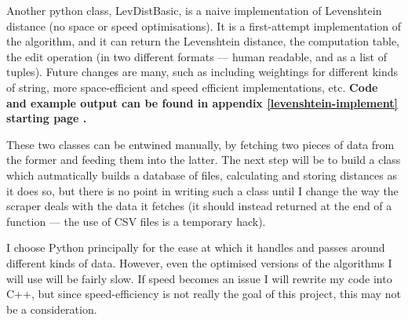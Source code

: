 Another python class, LevDistBasic, is a naive implementation of
Levenshtein distance (no space or speed optimisations). It is a
first-attempt implementation of the algorithm, and it can return the
Levenshtein distance, the computation table, the edit operation (in
two different formats --- human readable, and as a list of
tuples). Future changes are many, such as including weightings for
different kinds of string, more space-efficient and speed efficient
implementations, etc. \textbf{Code and example output can be found in
  appendix \ref{levenshtein-implement} starting page
  \pageref{levenshtein-implement}.}

These two classes can be entwined manually, by fetching two pieces of
data from the former and feeding them into the latter. The next step
will be to build a class which autmatically builds a database of
files, calculating and storing distances as it does so, but there is
no point in writing such a class until I change the way the scraper
deals with the data it fetches (it should instead returned at the end
of a function --- the use of CSV files is a temporary hack).

I choose Python principally for the ease at which it handles and
passes around different kinds of data. However, even the optimised
versions of the algorithms I will use will be fairly slow. If speed
becomes an issue I will rewrite my code into C++, but since
speed-efficiency is not really the goal of this project, this may not
be a consideration.
